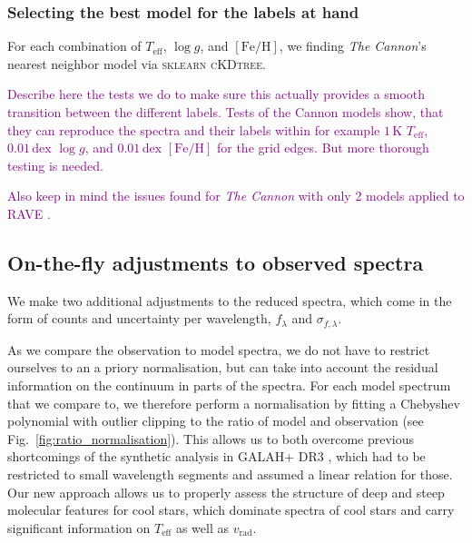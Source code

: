 \documentclass[
  journal=pasa,
  manuscript=research-paper, %
  year=2021,
  volume=37,
]{cup-journal}
\newcommand{\SB}[1]{{\textcolor{purple}{#1}}}
\newcommand{\Teff}{$T_\mathrm{eff}$\xspace}
\newcommand{\logg}{$\log g$\xspace}
\newcommand{\feh}{$\mathrm{[Fe/H]}$\xspace}
\newcommand{\vrad}{$v_\mathrm{rad}$\xspace}
\newcommand{\TheCannon}{\textit{The Cannon}\xspace}
\newcommand{\TLF}{\Teff, \logg, and \feh}
\newcommand{\dex}{\,\mathrm{dex}}	%
\newcommand{\K}{\,\mathrm{K}}	%
\begin{document}
\subsubsection{Selecting the best model for the labels at hand}

For each combination of \TLF, we finding \TheCannon's nearest neighbor model via \textsc{sklearn} \textsc{cKDtree}.

\SB{Describe here the tests we do to make sure this actually provides a smooth transition between the different labels. Tests of the Cannon models show, that they can reproduce the spectra and their labels within for example $1\K$ \Teff, $0.01\dex$ \logg, and $0.01\dex$ \feh for the grid edges. But more thorough testing is needed.}

\SB{Also keep in mind the issues found for \TheCannon with only 2 models applied to RAVE \citep{Casey2017}.}

\subsection{On-the-fly adjustments to observed spectra} \label{subsec:adjustments_observation}

We make two additional adjustments to the reduced spectra, which come in the form of counts and uncertainty per wavelength, $f_\lambda$ and $\sigma_{f,\lambda}$.

As we compare the observation to model spectra, we do not have to restrict ourselves to an a priory normalisation, but can take into account the residual information on the continuum in parts of the spectra. For each model spectrum that we compare to, we therefore perform a normalisation by fitting a Chebyshev polynomial with outlier clipping to the ratio of model and observation (see Fig.~\ref{fig:ratio_normalisation}). This allows us to both overcome previous shortcomings of the synthetic analysis in GALAH+ DR3 \citep{Buder2021}, which had to be restricted to small wavelength segments and assumed a linear relation for those. Our new approach allows us to properly assess the structure of deep and steep molecular features for cool stars, which dominate spectra of cool stars and carry significant information on \Teff as well as \vrad.
\end{document}
